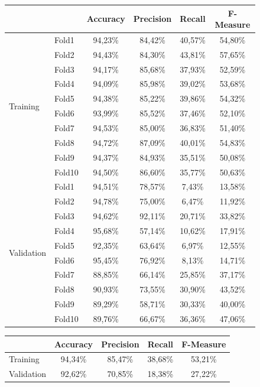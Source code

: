 \begin{figure}[H]
	\centering
	\begin{tabular}{llcccc}
		\toprule
		&& \textbf{Accuracy} & \textbf{Precision} & \textbf{Recall} & 
		\textbf{F-Measure}  \\
		\midrule
		\multirow{10}{*}{Training} & Fold1 & 94,23\% & 84,42\% & 40,57\% & 
		54,80\% \\
		& Fold2 & 94,43\%  & 84,30\% & 43,81\% & 57,65\% \\
		& Fold3 & 94,17\%  & 85,68\% & 37,93\% & 52,59\% \\
		& Fold4 & 94,09\%  & 85,98\% & 39,02\% & 53,68\% \\
		& Fold5 & 94,38\%  & 85,22\% & 39,86\% & 54,32\% \\
		& Fold6 & 93,99\%  & 85,52\% & 37,46\% & 52,10\% \\
		& Fold7 & 94,53\%  & 85,00\% & 36,83\% & 51,40\% \\
		& Fold8 & 94,72\%  & 87,09\% & 40,01\% & 54,83\% \\
		& Fold9 & 94,37\%  & 84,93\% & 35,51\% & 50,08\% \\
		& Fold10 & 94,50\% & 86,60\% & 35,77\% & 50,63\%  \\
		\midrule
		\multirow{10}{*}{Validation} & Fold1 & 94,51\% & 78,57\% & 7,43\% & 
		13,58\% \\
		& Fold2 & 94,78\% & 75,00\% & 6,47\% & 11,92\% \\
		& Fold3 & 94,62\% & 92,11\% & 20,71\% & 33,82\% \\
		& Fold4 & 95,68\% & 57,14\% & 10,62\% & 17,91\% \\
		& Fold5 & 92,35\% & 63,64\% & 6,97\% & 12,55\% \\
		& Fold6 & 95,45\% & 76,92\% & 8,13\% & 14,71\% \\
		& Fold7 & 88,85\% & 66,14\% & 25,85\% & 37,17\% \\
		& Fold8 & 90,93\% & 73,55\% & 30,90\% & 43,52\% \\
		& Fold9 & 89,29\% & 58,71\% & 30,33\% & 40,00\% \\
		& Fold10 & 89,76\% & 66,67\% & 36,36\% & 47,06\% \\
		\bottomrule 
	\end{tabular}
	\label{tab:rf_cv_fold_performance}
\end{figure}

\begin{figure}[H]
	\centering
	\begin{tabular}{lcccc}
		\toprule
		& \textbf{Accuracy} & \textbf{Precision} & \textbf{Recall} & 
		\textbf{F-Measure}  \\
		\midrule
		Training	&  94,34\% & 85,47\% & 38,68\%	& 53,21\%  	\\ 
		Validation	&  92,62\% & 70,85\% & 18,38\%	& 27,22\%	\\ 
		\bottomrule
	\end{tabular}
	\label{tab:rf_cv_performance}
\end{figure}


